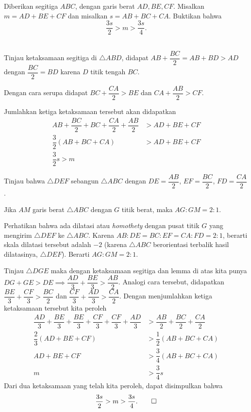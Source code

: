 \documentclass[11pt]{scrartcl}
\begin{document}
	\begin{soalbaru}
		Diberikan segitiga $ABC$, dengan garis berat $AD, BE, CF$. Misalkan $m=AD+BE+CF$ dan misalkan $s=AB+BC+CA$. Buktikan bahwa $$\dfrac{3s}{2} > m > \dfrac{3s}{4}.$$\\[-20pt]
		
		\begin{solusi}
		Tinjau ketaksamaan segitiga di $\triangle ABD$, didapat $AB+\dfrac{BC}{2} = AB+BD > AD$ dengan $\dfrac{BC}{2}=BD$ karena $D$ titik tengah $BC$.
		
		Dengan cara serupa didapat $BC+\dfrac{CA}{2} > BE$ dan $CA + \dfrac{AB}{2}>CF$.
		
		Jumlahkan ketiga ketaksamaan tersebut akan didapatkan 
		\begin{align*}
		AB+\dfrac{BC}{2}+BC+\dfrac{CA}{2}+\dfrac{AB}{2} &> AD+BE+CF\\
		\dfrac{3}{2}\left(AB+BC+CA\right)&> AD+BE+CF\\
		\dfrac{3}{2}s > m
		\end{align*}
		
		Tinjau bahwa $\triangle DEF$ sebangun $\triangle ABC$ dengan $DE = \dfrac{AB}{2}$, $EF=\dfrac{BC}{2}$, $FD=\dfrac{CA}{2}$. 
		
			\begin{lemmarev}
					Jika $AM$ garis berat $\triangle ABC$ dengan $G$ titik berat, maka $AG:GM = 2:1$.
					\begin{buktilemma}
					Perhatikan bahwa ada dilatasi atau \textit{ homothety } dengan pusat titik $G$ yang mengirim $\triangle DEF$ ke $\triangle ABC$. Karena $AB:DE=BC:EF=CA:FD=2:1$, berarti skala dilatasi tersebut adalah $-2$ (karena $\triangle ABC$ berorientasi terbalik hasil dilatasinya, $\triangle DEF$). Berarti $AG:GM=2:1$.
					\end{buktilemma}
				\end{lemmarev}
		
		Tinjau $\triangle DGE$ maka dengan ketaksamaan segitiga dan lemma di atas kita punya $DG + GE > DE \implies \dfrac{AD}{3}+\dfrac{BE}{3}>\dfrac{AB}{2}$. Analogi cara tersebut, didapatkan $\dfrac{BE}{3}+\dfrac{CF}{3}>\dfrac{BC}{2}$ dan $\dfrac{CF}{3}+\dfrac{AD}{3}>\dfrac{CA}{2}$. Dengan menjumlahkan ketiga ketaksamaan tersebut kita peroleh
		\begin{align*}
		\dfrac{AD}{3}+\dfrac{BE}{3}+\dfrac{BE}{3}+\dfrac{CF}{3}+\dfrac{CF}{3}+\dfrac{AD}{3} &> \dfrac{AB}{2}+\dfrac{BC}{2}+\dfrac{CA}{2}\\
		\dfrac{2}{3}\left(AD+BE+CF\right) &> \dfrac{1}{2}\left(AB+BC+CA\right)\\
		AD+BE+CF&> \dfrac{3}{4}\left(AB+BC+CA\right)\\
		m &> \dfrac{3}{4}s
		\end{align*}
		Dari dua ketaksamaan yang telah kita peroleh, dapat disimpulkan bahwa $$\dfrac{3s}{2} > m > \dfrac{3s}{4}.\qed$$ 
		\end{solusi}
	\end{soalbaru}
	
\end{document}
